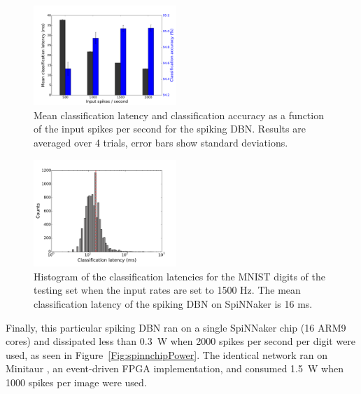 \begin{figure}[hbt!]
	\centering
	\includegraphics[width=0.48\textwidth]{images/evan/latencyCAfiringrate.pdf}
	\caption{Mean classification latency and classification accuracy as a function of the input spikes per second for the spiking DBN. Results are averaged over 4 trials, error bars show standard deviations.}
	\label{Fig:brianLatency}
\end{figure} 



\begin{figure}[hbt!]
	\centering
	\includegraphics[width=0.48\textwidth]{images/evan/classlatencyIJCNN1500hz.pdf}
	\caption{Histogram of the classification latencies for the MNIST digits of the testing set when the input rates are set to 1500 Hz. The mean classification latency of the spiking DBN on SpiNNaker is 16 ms.}
	\label{Fig:spinnLatency1500hz}
\end{figure} 


Finally, this particular spiking DBN ran on a single SpiNNaker chip (16 ARM9 cores) and dissipated less than 0.3~W when 2000 spikes per second per digit were used, as seen in Figure~\ref{Fig:spinnchipPower}. The identical network ran on Minitaur \citep{dannminitaur}, an event-driven FPGA implementation, and consumed 1.5~W when 1000 spikes per image were used.  


